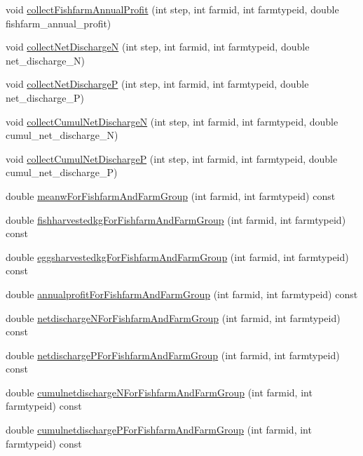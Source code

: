 \begin{DoxyCompactItemize}
\item 
void \mbox{\hyperlink{class_fishfarms_stats_a606f38d9ccf4579878977ff2fd32a93a}{collect\+Fishfarm\+Annual\+Profit}} (int step, int farmid, int farmtypeid, double fishfarm\+\_\+annual\+\_\+profit)
\item 
void \mbox{\hyperlink{class_fishfarms_stats_a49186d02bb98aab156a08b617a39df36}{collect\+Net\+DischargeN}} (int step, int farmid, int farmtypeid, double net\+\_\+discharge\+\_\+N)
\item 
void \mbox{\hyperlink{class_fishfarms_stats_afa93337cba6fa9c68f167bd3877c7e96}{collect\+Net\+DischargeP}} (int step, int farmid, int farmtypeid, double net\+\_\+discharge\+\_\+P)
\item 
void \mbox{\hyperlink{class_fishfarms_stats_aa6863500cdc18119208fce87ca0f17a0}{collect\+Cumul\+Net\+DischargeN}} (int step, int farmid, int farmtypeid, double cumul\+\_\+net\+\_\+discharge\+\_\+N)
\item 
void \mbox{\hyperlink{class_fishfarms_stats_ad224fc2ef86d60de8e36d98f220a04d5}{collect\+Cumul\+Net\+DischargeP}} (int step, int farmid, int farmtypeid, double cumul\+\_\+net\+\_\+discharge\+\_\+P)
\item 
double \mbox{\hyperlink{class_fishfarms_stats_ad9f988090a6f7f44926f97be98bf2ff0}{meanw\+For\+Fishfarm\+And\+Farm\+Group}} (int farmid, int farmtypeid) const
\item 
double \mbox{\hyperlink{class_fishfarms_stats_a422fda13332002d3e2f8f1b166d7ef20}{fishharvestedkg\+For\+Fishfarm\+And\+Farm\+Group}} (int farmid, int farmtypeid) const
\item 
double \mbox{\hyperlink{class_fishfarms_stats_a625de96732eaaa646df5775567ca39f2}{eggsharvestedkg\+For\+Fishfarm\+And\+Farm\+Group}} (int farmid, int farmtypeid) const
\item 
double \mbox{\hyperlink{class_fishfarms_stats_a6aa8dac7a8b1b39f84429c4a89d6e6de}{annualprofit\+For\+Fishfarm\+And\+Farm\+Group}} (int farmid, int farmtypeid) const
\item 
double \mbox{\hyperlink{class_fishfarms_stats_a114ef252ea728a670051c4fa65b1082f}{netdischarge\+N\+For\+Fishfarm\+And\+Farm\+Group}} (int farmid, int farmtypeid) const
\item 
double \mbox{\hyperlink{class_fishfarms_stats_aafb1c4ba743a01b4c743be724c510148}{netdischarge\+P\+For\+Fishfarm\+And\+Farm\+Group}} (int farmid, int farmtypeid) const
\item 
double \mbox{\hyperlink{class_fishfarms_stats_a52597b0a28803dafa6cfe84fe5ff0121}{cumulnetdischarge\+N\+For\+Fishfarm\+And\+Farm\+Group}} (int farmid, int farmtypeid) const
\item 
double \mbox{\hyperlink{class_fishfarms_stats_a35f21b6b4108a64c6bbb882a8598300e}{cumulnetdischarge\+P\+For\+Fishfarm\+And\+Farm\+Group}} (int farmid, int farmtypeid) const
\end{DoxyCompactItemize}
